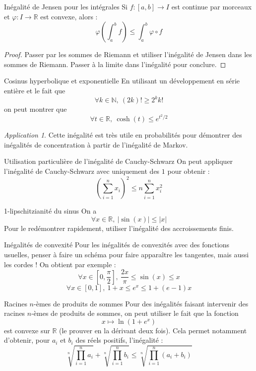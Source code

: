 \documentclass[french]{book}
\newcommand{\N}{\mathbb{N}}
\newcommand{\R}{\mathbb{R}}
\theoremstyle{plain}
\theoremstyle{definition}
\theoremstyle{remark}
\newtheorem*{app}{Application}
\begin{document}
\begin{AS}{Inégalité de Jensen pour les intégrales} Si $f:[a,b]\rightarrow I$ est continue par morceaux et $\varphi:I\rightarrow\R$ est convexe, alors : $$\varphi\left(\int_{a}^{b}f\right)\leqslant\int_{a}^{b}\varphi\circ f$$
\end{AS}
\begin{proof}
	Passer par les sommes de Riemann et utiliser l'inégalité de Jensen dans les sommes de Riemann. Passer à la limite dans l'inégalité pour conclure.
\end{proof}
\begin{AS}{Cosinus hyperbolique et exponentielle} En utilisant un développement en série entière et le fait que $$\forall k\in\N,\ (2k)!\geqslant2^kk!$$ on peut montrer que $$\forall t\in\R,\ \cosh(t)\leqslant e^{t^2/2}$$
\end{AS}
\begin{app}
	Cette inégalité est très utile en probabilités pour démontrer des inégalités de concentration à partir de l'inégalité de Markov.
\end{app}
\begin{AS}{Utilisation particulière de l'inégalité de Cauchy-Schwarz} On peut appliquer l'inégalité de Cauchy-Schwarz avec uniquement des $1$ pour obtenir : $$\left(\sum_{i=1}^{n}x_i\right)^2\leqslant n\sum_{i=1}^{n}x_i^2$$
\end{AS}

\begin{AS}{1-lipschitzianité du sinus} On a $$\forall x\in\R,\ \lvert\sin(x)\rvert\leqslant\lvert x\rvert$$ Pour le redémontrer rapidement, utiliser l'inégalité des accroissements finis.
\end{AS}

\begin{AS}{Inégalités de convexité} Pour les inégalités de convexités avec des fonctions usuelles, penser à faire un schéma pour faire apparaître les tangentes, mais aussi les cordes ! On obtient par exemple : $$\forall x\in\left[0,\frac{\pi}{2}\right],\ \frac{2x}{\pi}\leqslant \sin(x)\leqslant x$$
$$\forall x\in[0,1],\ 1+x\leqslant e^x\leqslant1+(e-1)x$$
\end{AS}

\begin{AS}{Racines $n$-èmes de produits de sommes} Pour des inégalités faisant intervenir des racines $n$-èmes de produits de sommes, on peut utiliser le fait que la fonction $$x\mapsto\ln(1+e^x)$$ est convexe sur $\R$ (le prouver en la dérivant deux fois). Cela permet notamment d'obtenir, pour $a_i$ et $b_i$ des réels positifs, l'inégalité : $$\sqrt[n]{\prod_{i=1}^{n}a_i}+\sqrt[n]{\prod_{i=1}^{n}b_i}\leqslant\sqrt[n]{\prod_{i=1}^{n}(a_i+b_i)}$$
\end{AS}
\end{document}
